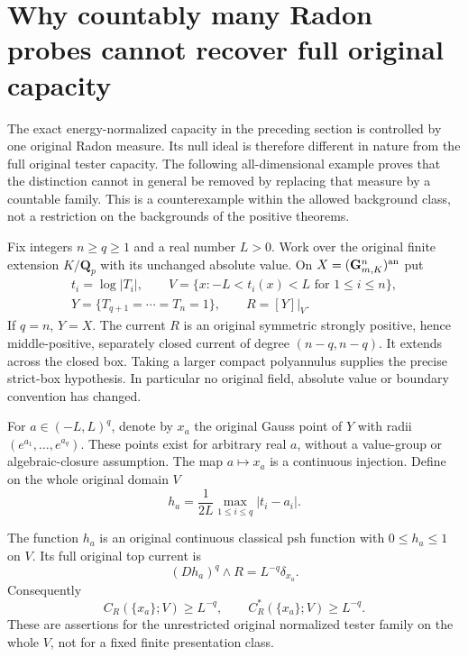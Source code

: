 \section{Why countably many Radon probes cannot recover full original capacity}
\label{sec:r12-countable-measure-capacity-obstruction}

The exact energy-normalized capacity in the preceding section is
controlled by one original Radon measure. Its null ideal is therefore
different in nature from the full original tester capacity. The
following all-dimensional example proves that the distinction cannot
in general be removed by replacing that measure by a countable family.
This is a counterexample within the allowed background class, not a
restriction on the backgrounds of the positive theorems.

Fix integers $n\geq q\geq1$ and a real number $L>0$. Work over the
original finite extension $K/\mathbf Q_p$ with its unchanged absolute
value. On $X=(\mathbf G_{m,K}^n)^{\rm an}$ put
\[
 \begin{gathered}
 t_i=\log|T_i|,\qquad
 V=\{x:-L<t_i(x)<L\text{ for }1\leq i\leq n\},\\
 Y=\{T_{q+1}=\cdots=T_n=1\},\qquad R=[Y]|_V.
 \end{gathered}
 \tag{CM1}
\]
If $q=n$, $Y=X$. The current $R$ is an original symmetric strongly
positive, hence middle-positive, separately closed current of degree
$(n-q,n-q)$. It extends across the closed box. Taking a larger compact
polyannulus supplies the precise strict-box hypothesis. In particular
no original field, absolute value or boundary convention has changed.

For $a\in(-L,L)^q$, denote by $x_a$ the original Gauss point of $Y$
with radii $(e^{a_1},\ldots,e^{a_q})$. These points exist for arbitrary
real $a$, without a value-group or algebraic-closure assumption.
The map $a\mapsto x_a$ is a continuous injection. Define on the
whole original domain $V$
\[
                      h_a=\frac{1}{2L}
                                  \max_{1\leq i\leq q}|t_i-a_i|.
 \tag{CM2}
\]

\begin{lemma}
\label{lem:r12-gauss-singleton-full-capacity}
The function $h_a$ is an original continuous classical psh function
with $0\leq h_a\leq1$ on $V$. Its full original top current is
\[
                         (Dh_a)^q\wedge R=L^{-q}\delta_{x_a}.
 \tag{CM3}
\]
Consequently
\[
             C_R(\{x_a\};V)\geq L^{-q},\qquad
             C_R^*(\{x_a\};V)\geq L^{-q}.
 \tag{CM4}
\]
These are assertions for the unrestricted original normalized tester
family on the whole $V$, not for a fixed finite presentation class.
\end{lemma}


